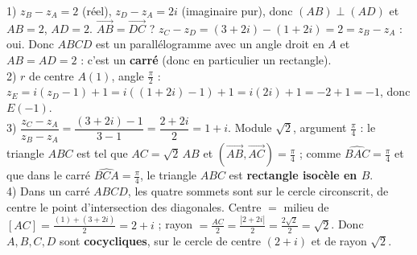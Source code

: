 1) $z_B-z_A=2$ (réel), $z_D-z_A=2i$ (imaginaire pur), donc $(AB)\perp(AD)$ et $AB=2$, $AD=2$.
$\overrightarrow{AB}=\overrightarrow{DC}$ ? $z_C-z_D=(3+2i)-(1+2i)=2=z_B-z_A$ : oui. Donc $ABCD$ est
un parallélogramme avec un angle droit en $A$ et $AB=AD=2$ : c'est un \textbf{carré} (donc en
particulier un rectangle).\\
2) $r$ de centre $A(1)$, angle $\frac\pi2$ : $z_E=i(z_D-1)+1=i((1+2i)-1)+1=i(2i)+1=-2+1=-1$,
donc $E(-1)$.\\
3) $\dfrac{z_C-z_A}{z_B-z_A}=\dfrac{(3+2i)-1}{3-1}=\dfrac{2+2i}{2}=1+i$. Module $\sqrt2$,
argument $\frac\pi4$ : le triangle $ABC$ est tel que $AC=\sqrt2\,AB$ et
$(\overrightarrow{AB},\overrightarrow{AC})=\frac\pi4$ ; comme $\widehat{BAC}=\frac\pi4$ et que
dans le carré $\widehat{BCA}=\frac\pi4$, le triangle $ABC$ est \textbf{rectangle isocèle en $B$}.\\
4) Dans un carré $ABCD$, les quatre sommets sont sur le cercle circonscrit, de centre le point
d'intersection des diagonales. Centre $=$ milieu de $[AC]=\frac{(1)+(3+2i)}2=2+i$ ; rayon
$=\frac{AC}2=\frac{|2+2i|}2=\frac{2\sqrt2}2=\sqrt2$. Donc $A,B,C,D$ sont \textbf{cocycliques}, sur
le cercle de centre $(2+i)$ et de rayon $\sqrt2$.

